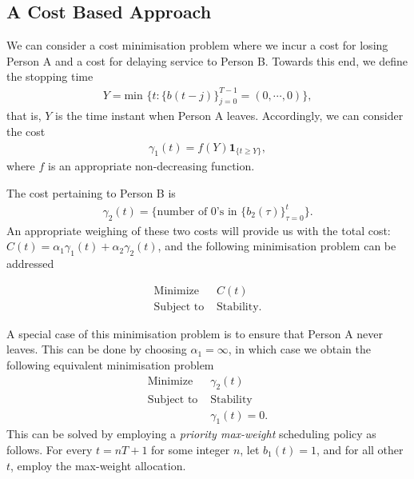 \documentclass[10pt,a4paper]{article}
\begin{document}
%
%
%



\subsection{A Cost Based Approach}
We can consider a cost minimisation problem where we incur a cost for losing Person A and a cost for delaying service to Person B. Towards this end, we define the stopping time 
\begin{align*}
Y = \text{min }\big\{t: \{b(t-j)\}_{j=0}^{T-1} = (0,\cdots,0) \big\},
\end{align*}
that is, $Y$ is the time instant when Person A leaves. Accordingly, we can consider the cost 
\begin{align*}
\gamma_1(t) = f(Y)\mathbf{1}_{\{t\geq Y\}},
\end{align*} 
where $f$ is an appropriate non-decreasing function. 


The cost pertaining to Person B is 
\begin{align}
\label{eqn:CostB}
\gamma_2(t) = \{ \text{number of $0$'s in } \{b_2(\tau)\}_{\tau=0}^t\}.
 \end{align}
An appropriate weighing of these two costs will provide us with the total cost: $C(t) = \alpha_1 \gamma_1(t) + \alpha_2 \gamma_2(t)$, and the following minimisation problem can be addressed

\begin{equation*}
\begin{array}{lc}
\text{Minimize } & C(t) \\
\text{Subject to } & \text{Stability.}
\end{array}
\end{equation*}


A special case of this minimisation problem is to ensure that Person A never leaves. This can be done by choosing $\alpha_1 = \infty$, in which case we obtain the following equivalent minimisation problem
\begin{equation*}
\begin{array}{lc}
\text{Minimize } & \gamma_2(t) \\
\text{Subject to } & \text{Stability} \\
~& \gamma_1(t) = 0.
\end{array}
\end{equation*}
This can be solved by employing a {\it priority max-weight} scheduling policy as follows. For every $t=nT+1$ for some integer $n$, let $b_1(t) = 1$, and for all other $t$, employ the max-weight allocation. 
\end{document}
